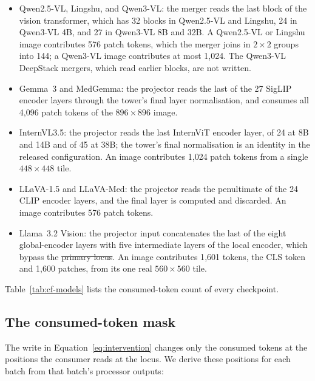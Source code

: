 \documentclass{article}
\makeatletter
\providecommand{\DIFaddtex}[1]{{\protect\color{blue}\uwave{#1}}} %
\providecommand{\DIFdeltex}[1]{{\protect\color{red}\sout{#1}}} %
\providecommand{\DIFaddbegin}{} %
\providecommand{\DIFaddend}{} %
\providecommand{\DIFdelbegin}{} %
\providecommand{\DIFdelend}{} %
\providecommand{\DIFadd}[1]{\texorpdfstring{\DIFaddtex{#1}}{#1}} %
\providecommand{\DIFdel}[1]{\texorpdfstring{\DIFdeltex{#1}}{}} %
\providecommand{\DIFscaledelfig}{0.5}
\newlength{\DIFdelgraphicswidth} %
\newlength{\DIFdelgraphicsheight} %
\providecommand{\DIFaddincludegraphics}[2][]{{\color{blue}\fbox{\DIFOincludegraphics[#1]{#2}}}} %
\providecommand{\DIFdelincludegraphics}[2][]{%
\sbox{\DIFdelgraphicsbox}{\DIFOincludegraphics[#1]{#2}}%
\settoboxwidth{\DIFdelgraphicswidth}{\DIFdelgraphicsbox} %
\settoboxtotalheight{\DIFdelgraphicsheight}{\DIFdelgraphicsbox} %
\scalebox{\DIFscaledelfig}{%
\parbox[b]{\DIFdelgraphicswidth}{\usebox{\DIFdelgraphicsbox}\\[-\baselineskip] \rule{\DIFdelgraphicswidth}{0em}}\llap{\resizebox{\DIFdelgraphicswidth}{\DIFdelgraphicsheight}{%
\setlength{\unitlength}{\DIFdelgraphicswidth}%
\begin{picture}(1,1)%
\thicklines\linethickness{2pt} %
{\color[rgb]{1,0,0}\put(0,0){\framebox(1,1){}}}%
{\color[rgb]{1,0,0}\put(0,0){\line( 1,1){1}}}%
{\color[rgb]{1,0,0}\put(0,1){\line(1,-1){1}}}%
\end{picture}%
}\hspace*{3pt}}} %
} %
\DeclareRobustCommand{\DIFaddbegin}{\DIFOaddbegin \let\includegraphics\DIFaddincludegraphics} %
\DeclareRobustCommand{\DIFaddend}{\DIFOaddend \let\includegraphics\DIFOincludegraphics} %
\DeclareRobustCommand{\DIFdelbegin}{\DIFOdelbegin \let\includegraphics\DIFdelincludegraphics} %
\DeclareRobustCommand{\DIFdelend}{\DIFOaddend \let\includegraphics\DIFOincludegraphics} %
\let\sout@orig\sout %
\renewcommand{\sout}[1]{\ifmmode\text{\sout@orig{\ensuremath{#1}}}\else\sout@orig{#1}\fi} %
\makeatother
\begin{document}
\begin{itemize}[leftmargin=*,itemsep=1pt,topsep=2pt]
\item Qwen2.5-VL, Lingshu, and Qwen3-VL: the merger reads the last block of the vision transformer, which has 32 blocks in Qwen2.5-VL and Lingshu, 24 in Qwen3-VL 4B, and 27 in Qwen3-VL 8B and 32B. A Qwen2.5-VL or Lingshu image contributes 576 patch tokens, which the merger joins in $2\times2$ groups into 144; a Qwen3-VL image contributes at most 1{,}024. The Qwen3-VL DeepStack mergers, which read earlier blocks, are not written.
\item Gemma~3 and MedGemma: the projector reads the last of the 27 SigLIP encoder layers through the tower's final layer normalisation, and consumes all 4{,}096 patch tokens of the $896\times896$ image.
\item InternVL3.5: the projector reads the last InternViT encoder layer, of 24 at 8B and 14B and of 45 at 38B; the tower's final normalisation is an identity in the released configuration. An image contributes 1{,}024 patch tokens from a single $448\times448$ tile.
\item LLaVA-1.5 and LLaVA-Med: the projector reads the penultimate of the 24 CLIP encoder layers, and the final layer is computed and discarded. An image contributes 576 patch tokens.
\item Llama~3.2 Vision: the projector input concatenates the last of the eight global-encoder layers with five intermediate layers of the local encoder, which bypass the \DIFdelbegin \DIFdel{primary locus}\DIFdelend \DIFaddbegin \DIFadd{consumed block}\DIFaddend . An image contributes 1{,}601 tokens, the CLS token and 1{,}600 patches, from its one real $560\times560$ tile.
\end{itemize}
Table~\ref{tab:cf-models} lists the consumed-token count of every checkpoint.

\subsection{The consumed-token mask}
\label{app:repro-mask}

The write in Equation~\ref{eq:intervention} changes only the consumed tokens at the positions the consumer reads at the locus. We derive these positions for each batch from that batch's processor outputs:
\end{document}
